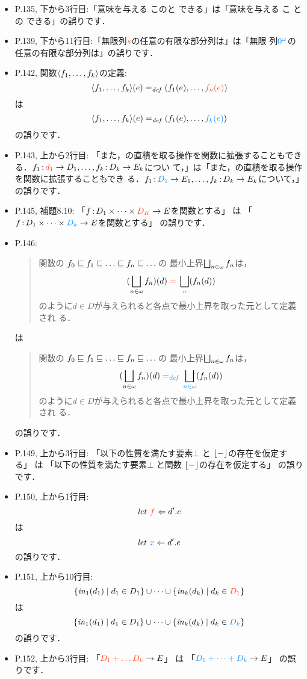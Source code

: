\documentclass[12pt,titlepage,twoside,openright,dvipdfmx]{jsbook}
\newcommand\old[1]{%
  \textcolor[rgb]{1.0,0.25,0.1}{#1}%
  }
\newcommand\new[1]{%
  \textcolor[rgb]{0,0.55,1.0}{#1}%
  }
\theoremstyle{definition}
\begin{document}
\ifnum{}
\ifnum{}
\begin{itemize}
\item P.135, 下から3行目:「意味を与える\old{このと}できる」は「意味を与える\new{こ
  との}できる」の誤りです．
\item P.139,
  下から11行目:「無限列$\old{s}$の任意の有限な部分列は」は「無限
  列$\new{0^\omega}$の任意の有限な部分列は」の誤りです．
\item P.142, 関数$\langle{f_1,\dots,f_k}\rangle$の定義:
  \[
    \tuple{f_1,\dots,f_k}(e) =_{\mathit{def}} (f_1(e),\dots,\old{f_n(e)})
  \]
  は
  \[
    \tuple{f_1,\dots,f_k}(e) =_{\mathit{def}} (f_1(e),\dots,\new{f_k(e)})
  \]
  の誤りです．
\item P.143, 上から2行目:
  「また，\cpo{}の直積を取る操作を関数に拡張することもできる．$f_1
  \COL \old{d_1} \rightarrow D_1,\dots,f_k \COL D_k \rightarrow E_k$につい
  て，」は「また，\cpo{}の直積を取る操作を関数に拡張することもでき
  る．$f_1 \COL \new{D_1} \rightarrow E_1, \dots,f_k \COL D_k \rightarrow
  E_k$について，」の誤りです．
\item P.145, 補題8.10:
  「$f \COL D_1 \times \dots \times \old{D_K} \rightarrow E$を関数とする」
  は
  「$f \COL D_1 \times \dots \times \new{D_k} \rightarrow E$を関数とする」
  の誤りです．
\item P.146:
  \begin{quote}
    関数の \omegachain $f_0 \sqle f_1 \sqle \dots \sqle f_n \sqle \dots$の
    最小上界$\bigsqcup_{n \in \omega} f_n$は，
    \[
      (\bigsqcup_{n \in \NAT} f_n)(d) \old{{}={}} \bigsqcup_{\old{n}}(f_n(d))
    \]
    のように$d \in D$が与えられると各点で最小上界を取った元として定義され
    る．
  \end{quote}
  は
  \begin{quote}
    関数の \omegachain $f_0 \sqle f_1 \sqle \dots \sqle f_n \sqle \dots$の
    最小上界$\bigsqcup_{n \in \omega} f_n$は，
    \[
      (\bigsqcup_{n \in \NAT} f_n)(d) \new{{}=_{\mathit{def}}{}} \bigsqcup_{\new{n \in \NAT}}(f_n(d))
    \]
    のように$d \in D$が与えられると各点で最小上界を取った元として定義され
    る．
  \end{quote}
  の誤りです．
\item P.149, 上から3行目:
  「以下の性質を満たす要素$\bot$\old{と}$\lfloor - \rfloor$の存在を仮定する」
  は
  「以下の性質を満たす要素$\bot$\new{と関数}$\lfloor - \rfloor$の存在を仮定する」
  の誤りです．
\item P.150, 上から1行目:
  \[
    \METALET\ \old{f} \Leftarrow d'. e
  \]
  は
  \[
    \METALET\ \new{x} \Leftarrow d'. e
  \]
  の誤りです．
\item P.151, 上から10行目:
  \[
    \set{\INJ_1(d_1) \mid d_1 \in D_1} \cup \dots \cup \set{\INJ_k(d_k) \mid d_k \in \old{D_1}}
  \]
  は
  \[
    \set{\INJ_1(d_1) \mid d_1 \in D_1} \cup \dots \cup \set{\INJ_k(d_k) \mid d_k \in \new{D_k}}
  \]
  の誤りです．
\item P.152, 上から3行目:
  「$\old{D_1 + \dots D_k} \rightarrow E$」
  は
  「$\new{D_1 + \dots + D_k} \rightarrow E$」
  の誤りです．
\end{itemize}
\fi
\fi
\end{document}
